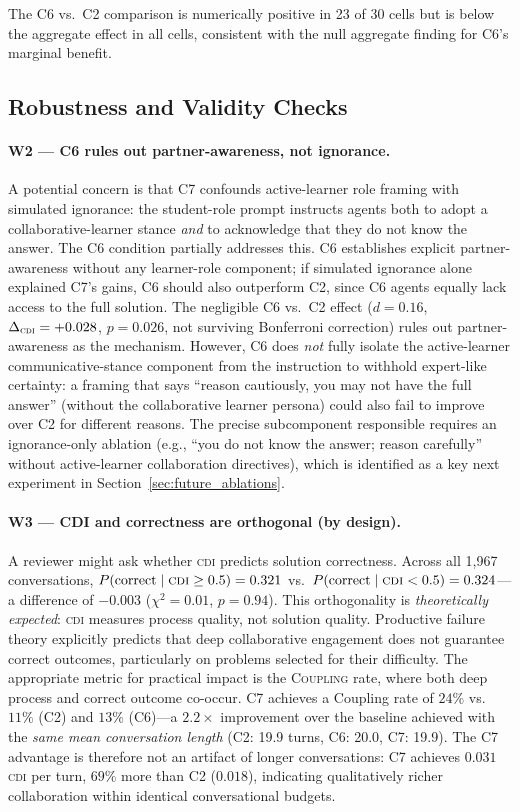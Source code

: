 \documentclass{article}
\newcommand{\CDI}{\textsc{cdi}}
\begin{document}
The C6 vs.\ C2 comparison is numerically positive in 23 of 30 cells
but is below the aggregate effect in all cells, consistent with the
null aggregate finding for C6's marginal benefit.

\subsection{Robustness and Validity Checks}

\paragraph{W2 — C6 rules out partner-awareness, not ignorance.}
A potential concern is that C7 confounds active-learner role framing
with simulated ignorance: the student-role prompt instructs agents both
to adopt a collaborative-learner stance \emph{and} to acknowledge that
they do not know the answer. The C6 condition partially addresses this.
C6 establishes explicit partner-awareness without any learner-role
component; if simulated ignorance alone explained C7's gains, C6
should also outperform C2, since C6 agents equally lack access to the
full solution. The negligible C6 vs.\ C2 effect ($d=0.16$,
$\Delta_{\CDI} = +0.028$, $p = 0.026$, not surviving Bonferroni
correction) rules out partner-awareness as the mechanism. However, C6
does \emph{not} fully isolate the active-learner communicative-stance
component from the instruction to withhold expert-like certainty: a framing that says
``reason cautiously, you may not have the full answer'' (without the
collaborative learner persona) could also fail to improve over C2 for
different reasons. The precise subcomponent responsible requires an
ignorance-only ablation (e.g., ``you do not know the answer; reason
carefully'' without active-learner collaboration directives), which is
identified as a key next experiment in Section~\ref{sec:future_ablations}.

\paragraph{W3 — CDI and correctness are orthogonal (by design).}
A reviewer might ask whether \CDI{} predicts solution correctness.
Across all 1,967 conversations, $P(\text{correct} \mid \CDI \geq 0.5)
= 0.321$ vs.\ $P(\text{correct} \mid \CDI < 0.5) = 0.324$---a
difference of $-0.003$ ($\chi^2 = 0.01$, $p = 0.94$). This
orthogonality is \emph{theoretically expected}: \CDI{} measures
process quality, not solution quality. Productive failure theory
\citep{kapur2016examining} explicitly predicts that deep collaborative
engagement does not guarantee correct outcomes, particularly on
problems selected for their difficulty. The appropriate metric for
practical impact is the \textsc{Coupling} rate, where both deep
process and correct outcome co-occur. C7 achieves a Coupling rate of
$24\%$ vs.\ $11\%$ (C2) and $13\%$ (C6)---a $2.2\times$ improvement
over the baseline achieved with the \emph{same mean conversation length}
(C2: 19.9 turns, C6: 20.0, C7: 19.9). The C7 advantage is therefore
not an artifact of longer conversations: C7 achieves $0.031$ \CDI{}
per turn, $69\%$ more than C2 ($0.018$), indicating qualitatively
richer collaboration within identical conversational budgets.
\end{document}
